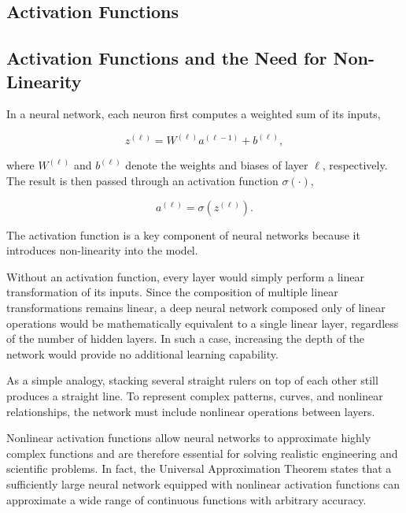 \subsection{Activation Functions}

\subsection{Activation Functions and the Need for Non-Linearity}

In a neural network, each neuron first computes a weighted sum of its inputs,

\begin{equation}
z^{(\ell)} = W^{(\ell)} a^{(\ell-1)} + b^{(\ell)},
\end{equation}

where $W^{(\ell)}$ and $b^{(\ell)}$ denote the weights and biases of layer $\ell$, respectively. The result is then passed through an activation function $\sigma(\cdot)$,

\begin{equation}
a^{(\ell)} = \sigma\left(z^{(\ell)}\right).
\end{equation}

The activation function is a key component of neural networks because it introduces non-linearity into the model.

Without an activation function, every layer would simply perform a linear transformation of its inputs. Since the composition of multiple linear transformations remains linear, a deep neural network composed only of linear operations would be mathematically equivalent to a single linear layer, regardless of the number of hidden layers. In such a case, increasing the depth of the network would provide no additional learning capability.

As a simple analogy, stacking several straight rulers on top of each other still produces a straight line. To represent complex patterns, curves, and nonlinear relationships, the network must include nonlinear operations between layers.

Nonlinear activation functions allow neural networks to approximate highly complex functions and are therefore essential for solving realistic engineering and scientific problems. In fact, the Universal Approximation Theorem states that a sufficiently large neural network equipped with nonlinear activation functions can approximate a wide range of continuous functions with arbitrary accuracy.

